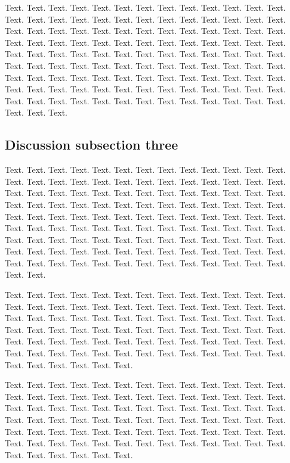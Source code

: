 \documentclass[a4,center,fleqn]{NAR}
\begin{document}
Text. Text. Text. Text. Text. Text. Text. Text. Text. Text. Text.
Text. Text. Text. Text. Text. Text. Text. Text. Text. Text. Text.
Text. Text. Text. Text. Text. Text. Text. Text. Text. Text. Text.
Text. Text. Text. Text. Text. Text. Text. Text. Text. Text. Text.
Text. Text. Text. Text. Text. Text. Text. Text. Text. Text. Text.
Text. Text. Text. Text. Text. Text. Text. Text. Text. Text. Text.
Text. Text. Text. Text. Text. Text. Text. Text. Text. Text. Text.
Text. Text. Text. Text. Text. Text. Text. Text. Text. Text. Text.
Text. Text. Text. Text. Text. Text. Text. Text. Text. Text. Text.
Text. Text. Text. Text. Text. Text. Text. Text. Text. Text. Text.
Text. Text. Text. Text. Text. Text. Text. Text. Text. Text.


\subsection{Discussion subsection three}

Text. Text. Text. Text. Text. Text. Text. Text. Text. Text. Text.
Text. Text. Text. Text. Text. Text. Text. Text. Text. Text. Text.
Text. Text. Text. Text. Text. Text. Text. Text. Text. Text. Text.
Text. Text. Text. Text. Text. Text. Text. Text. Text. Text. Text.
Text. Text. Text. Text. Text. Text. Text. Text. Text. Text. Text.
Text. Text. Text. Text. Text. Text. Text. Text. Text. Text. Text.
Text. Text. Text. Text. Text. Text. Text. Text. Text. Text. Text.
Text. Text. Text. Text. Text. Text. Text. Text. Text. Text. Text.
Text. Text. Text. Text. Text. Text. Text. Text. Text. Text. Text.
Text. Text. Text. Text. Text. Text. Text. Text. Text. Text. Text.
Text. Text. Text. Text. Text. Text. Text. Text. Text.

Text. Text. Text. Text. Text. Text. Text. Text. Text. Text. Text.
Text. Text. Text. Text. Text. Text. Text. Text. Text. Text. Text.
Text. Text. Text. Text. Text. Text. Text. Text. Text. Text. Text.
Text. Text. Text. Text. Text. Text. Text. Text. Text. Text. Text.
Text. Text. Text. Text. Text. Text. Text. Text. Text. Text. Text.
Text. Text. Text. Text. Text. Text. Text. Text. Text. Text. Text.
Text. Text. Text. Text. Text. Text. Text. Text. Text. Text. Text.
Text. Text. Text. Text. Text. Text. Text.

Text. Text. Text. Text. Text. Text. Text. Text. Text. Text. Text.
Text. Text. Text. Text. Text. Text. Text. Text. Text. Text. Text.
Text. Text. Text. Text. Text. Text. Text. Text. Text. Text. Text.
Text. Text. Text. Text. Text. Text. Text. Text. Text. Text. Text.
Text. Text. Text. Text. Text. Text. Text. Text. Text. Text. Text.
Text. Text. Text. Text. Text. Text. Text. Text. Text. Text. Text.
Text. Text. Text. Text. Text. Text. Text. Text. Text. Text. Text.
Text. Text. Text. Text. Text. Text. Text.
\end{document}
